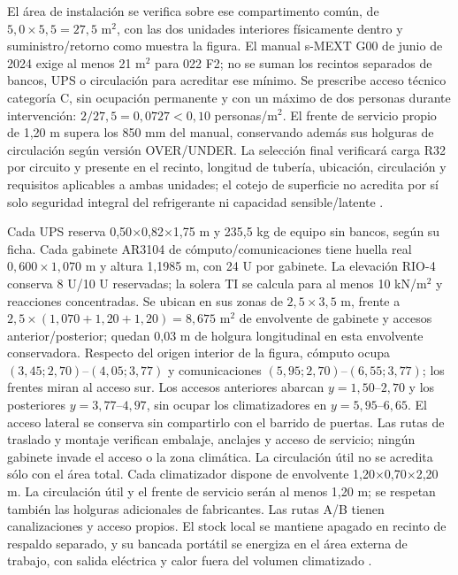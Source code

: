 El área de instalación se verifica sobre ese compartimento común, de $5,0\times5,5=27,5$ m$^2$, con las dos unidades interiores físicamente dentro y suministro/retorno como muestra la figura. El manual s-MEXT G00 de junio de 2024 exige al menos 21 m$^2$ para 022 F2; no se suman los recintos separados de bancos, UPS o circulación para acreditar ese mínimo. Se prescribe acceso técnico categoría C, sin ocupación permanente y con un máximo de dos personas durante intervención: $2/27,5=0,0727<0,10$ personas/m$^2$. El frente de servicio propio de 1,20 m supera los 850 mm del manual, conservando además sus holguras de circulación según versión OVER/UNDER. La selección final verificará carga R32 por circuito y presente en el recinto, longitud de tubería, ubicación, circulación y requisitos aplicables a ambas unidades; el cotejo de superficie no acredita por sí solo seguridad integral del refrigerante ni capacidad sensible/latente \parencite[secc.~2.2.5--2.2.7, p.~21]{p9-mext-manual-2024}.

Cada UPS reserva 0,50$\times$0,82$\times$1,75 m y 235,5 kg de equipo sin bancos, según su ficha. Cada gabinete AR3104 de cómputo/comunicaciones tiene huella real $0,600\times1,070$ m y altura 1,1985 m, con 24 U por gabinete. La elevación RIO-4 conserva 8 U/10 U reservadas; la solera TI se calcula para al menos 10 kN/m$^2$ y reacciones concentradas. Se ubican en sus zonas de $2,5\times3,5$ m, frente a $2,5\times(1,070+1,20+1,20)=8,675$ m$^2$ de envolvente de gabinete y accesos anterior/posterior; quedan 0,03 m de holgura longitudinal en esta envolvente conservadora. Respecto del origen interior de la figura, cómputo ocupa $(3,45;2,70)$--$(4,05;3,77)$ y comunicaciones $(5,95;2,70)$--$(6,55;3,77)$; los frentes miran al acceso sur. Los accesos anteriores abarcan $y=1,50$--$2,70$ y los posteriores $y=3,77$--$4,97$, sin ocupar los climatizadores en $y=5,95$--$6,65$. El acceso lateral se conserva sin compartirlo con el barrido de puertas. Las rutas de traslado y montaje verifican embalaje, anclajes y acceso de servicio; ningún gabinete invade el acceso o la zona climática. La circulación útil no se acredita sólo con el área total. Cada climatizador dispone de envolvente 1,20$\times$0,70$\times$2,20 m. La circulación útil y el frente de servicio serán al menos 1,20 m; se respetan también las holguras adicionales de fabricantes. Las rutas A/B tienen canalizaciones y acceso propios. El stock local se mantiene apagado en recinto de respaldo separado, y su bancada portátil se energiza en el área externa de trabajo, con salida eléctrica y calor fuera del volumen climatizado \parencites{p7-eaton-93t60}{p6-mext-databook}{p12-apc-ar3104}.

